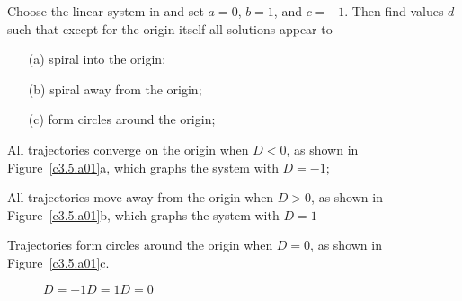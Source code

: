 \documentclass{ximera}
\begin{document}
\begin{exercise} \label{c3.5.a01}
Choose the {\sf linear system} in {\pplane} and set $a=0$, $b=1$, and 
$c=-1$.  Then find values $d$ such that except for the origin itself all 
solutions appear to
\begin{itemize}
\item[(a)] spiral into the origin;
\item[(b)] spiral away from the origin;
\item[(c)] form circles around the origin;
\end{itemize}

\begin{solution}

\soln
\begin{enumeratea}
\item All trajectories converge on the origin when $D < 0$, as shown in
Figure~\ref{c3.5.a01}a, which graphs the system with $D =- 1$;

\item All trajectories move away from the origin when $D > 0$, as shown in
Figure~\ref{c3.5.a01}b, which graphs the system with $D = 1$

\item Trajectories form circles around the origin when $D = 0$, as shown in
Figure~\ref{c3.5.a01}c.
\begin{figure}[htb]
                       \centerline{%
                       }
	\centerline{$D = -1$\hspace{1.4in}$D = 1$\hspace{1.4in}$D = 0$}
\end{figure}
\end{enumeratea}
\end{solution}
\end{exercise}
\end{document}
